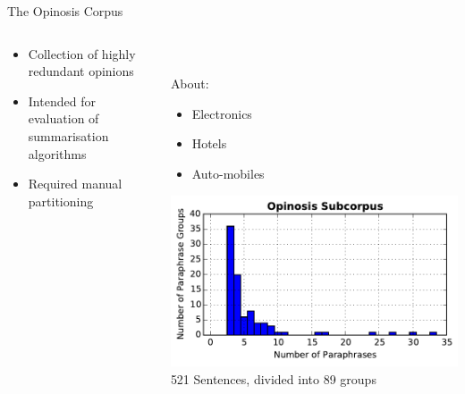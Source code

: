 \documentclass[12pt,landscape,english]{beamer}
\begin{document}
\begin{frame}{The Opinosis Corpus}
	\begin{columns}
		\begin{column}[T]{0.5\textwidth}
			\begin{itemize}
				\item Collection of highly redundant opinions
				\item Intended for evaluation of summarisation algorithms
				\item Required manual partitioning
			\end{itemize}
		\end{column}
		\begin{column}[t]{0.5\textwidth}
			\\
			\begin{overprint}
				About:
				\begin{itemize}
					\item Electronics
					\item Hotels
					\item Auto-mobiles
				\end{itemize}
				
				\includegraphics[width=\textwidth]{opinosis_hist.pdf}\\
				521 Sentences, divided into 89 groups
			\end{overprint}

		\end{column}
	\end{columns}
	
\end{frame}
\end{document}
